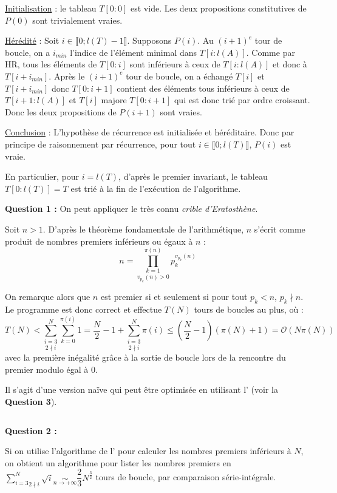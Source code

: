 \documentclass[../main.tex]{subfiles}
\begin{document}
\underline{Initialisation} : le tableau $T[0:0]$ est vide. Les deux propositions constitutives de $P(0)$ sont trivialement vraies.

\underline{Hérédité} : Soit $i\in\llbracket 0; l(T) - 1\rrbracket$. Supposons $P(i)$. Au $(i + 1)^e$ tour de boucle, on a $i_{min}$ l'indice de l'élément minimal dans $T[i:l(A)]$. Comme par HR, tous les éléments de $T[0:i]$ sont inférieurs à ceux de $T[i:l(A)]$ et donc à $T[i + i_{min}]$. Après le $(i+1)^e$ tour de boucle, on a échangé $T[i]$ et $T[i + i_{min}]$ donc $T[0:i+1]$ contient des éléments tous inférieurs à ceux de $T[i+1:l(A)]$ et $T[i]$ majore $T[0:i+1]$ qui est donc trié par ordre croissant. \newline
Donc les deux propositions de $P(i+1)$ sont vraies.

\underline{Conclusion} : L'hypothèse de récurrence est initialisée et héréditaire. Donc par principe de raisonnement par récurrence, pour tout $i\in\llbracket 0; l(T)\rrbracket$, $P(i)$ est vraie.

En particulier, pour $i = l(T)$, d'après le premier invariant, le tableau $T[0:l(T)] = T$ est trié à la fin de l'exécution de l'algorithme.


\textbf{Question 1 :} On peut appliquer le très connu \textit{crible d'Eratosthène}.

Soit $n > 1$. D'après le théorème fondamentale de l'arithmétique, $n$ s'écrit comme produit de nombres premiers inférieurs ou égaux à $n$ : $$n = \displaystyle\underset{v_{p_{k}}(n) > 0}{\prod_{k = 1}^{\pi(n)}}p_{k}^{v_{p_{k}}(n)}$$

On remarque alors que $n$ est premier si et seulement si pour tout $p_k < n$, $p_k \nmid n$. Le programme est donc correct et effectue $T(N)$ tours de boucles au plus, où :
$$T(N) < \underset{2\nmid i}{\sum_{i=3}^{N}}\sum_{k = 0}^{\pi(i)}1 = \dfrac{N}{2} - 1 + \underset{2\nmid i}{\sum_{i=3}^{N}}\pi(i) \leq (\dfrac{N}{2} - 1)(\pi(N) + 1) = \mathcal{O}(N\pi(N))$$
avec la première inégalité grâce à la sortie de boucle lors de la rencontre du premier modulo égal à 0.

Il s'agit d'une version naïve qui peut être optimisée en utilisant l' (voir la \textbf{Question 3}).

\inputminted{c}{solutions/list_primal_naive_eratosthene.c}

\textbf{Question 2 :}

Si on utilise l'algorithme de l' pour calculer les nombres premiers inférieurs à $N$, on obtient un algorithme pour lister les nombres premiers en $\displaystyle\underset{2\nmid i}{\sum_{i = 3}^{N}}\sqrt{i} \underset{n\rightarrow+\infty}{\sim}\dfrac{2}{3}N^{\frac{3}{2}}$ tours de boucle, par comparaison série-intégrale. 
\end{document}
